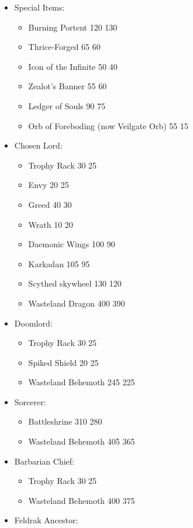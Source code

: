 \begin{itemize}
\item Special Items:
\begin{itemize}
\item Burning Portent 120 \costup{} 130
\item Thrice-Forged 65 \costdown{} 60
\item Icon of the Infinite 50 \costdown{} 40
\item Zealot's Banner 55 \costup{} 60
\item Ledger of Souls 90 \costdown{} 75
\item Orb of Foreboding (now Veilgate Orb) 55 \costdown{} 15
\end{itemize}
\item Chosen Lord:
\begin{itemize} 
\item Trophy Rack 30 \costdown{} 25
\item Envy 20 \costup{} 25
\item Greed 40 \costdown{} 30
\item Wrath 10 \costup{} 20
\item Daemonic Wings 100 \costdown{} 90
\item Karkadan 105 \costdown{} 95
\item Scythed skywheel 130 \costdown{} 120
\item Wasteland Dragon 400 \costdown{} 390
\end{itemize}
\item Doomlord:
\begin{itemize}
\item Trophy Rack 30 \costdown{} 25
\item Spiked Shield 20 \costup{} 25
\item Wasteland Behemoth 245 \costdown{} 225
\end{itemize}
\item Sorcerer:
\begin{itemize}
\item Battleshrine 310 \costdown{} 280
\item Wasteland Behemoth 405 \costdown{} 365
\end{itemize}
\item Barbarian Chief:
\begin{itemize}
\item Trophy Rack 30 \costdown{} 25
\item Wasteland Behemoth 400 \costdown{} 375
\end{itemize}
\item Feldrak Ancestor:

\end{itemize}
